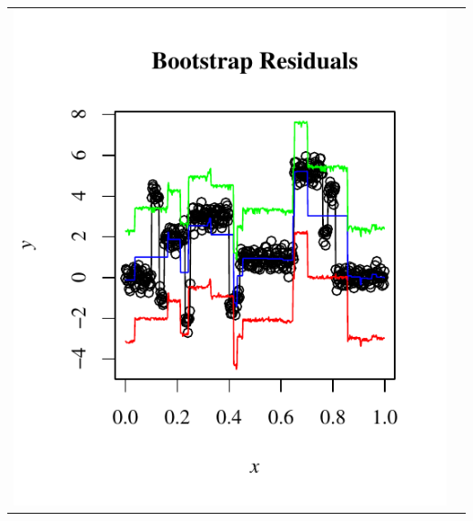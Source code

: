 \documentclass[11pt]{article}
\begin{document}
\begin{table}[h]
\begin{center}
\begin{tabular}{| >{\centering\arraybackslash}m{3in} |  >{\centering\arraybackslash}m{3in} |}
    \end{tabular}
  \end{center}
\end{table}

\subsection{}

\begin{table}[h]
  \begin{center}
    \renewcommand{\arraystretch}{1.5}
    \begin{tabular}{| >{\centering\arraybackslash}m{3in} |  >{\centering\arraybackslash}m{3in} |}
      \hline
      \includegraphics[width=1\linewidth,height=0.3\textheight]{Graphs/confidenceresid1}&

\end{tabular}
\end{center}
\end{table}
\end{document}
